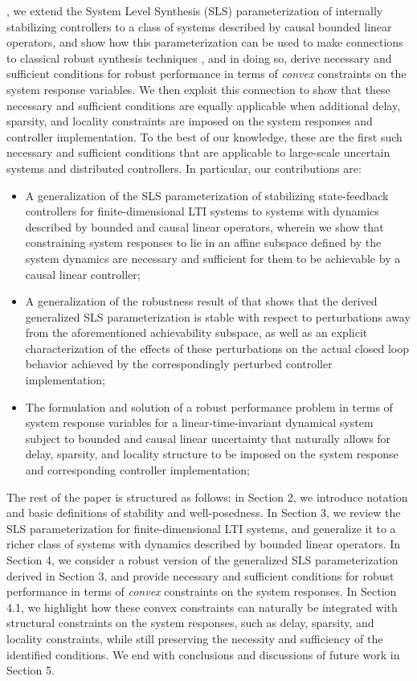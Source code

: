 , we extend the System Level Synthesis (SLS) parameterization of internally stabilizing controllers to a class of systems described by causal bounded linear operators, and show how this parameterization can be used to make connections to classical robust synthesis techniques \cite{khammash1990stability,dahleh1994control}, and in doing so, derive necessary and sufficient conditions for robust performance in terms of \emph{convex} constraints on the system response variables.  We then exploit this connection to show that these necessary and sufficient conditions are equally applicable when additional delay, sparsity, and locality constraints are imposed on the system responses and controller implementation.  To the best of our knowledge, these are the first such necessary and sufficient conditions that are applicable to large-scale uncertain systems and distributed controllers.  In particular, our contributions are:
\begin{itemize}
\item A generalization of the SLS parameterization of stabilizing state-feedback controllers for finite-dimensional LTI systems \cite{wang2019system} to systems with dynamics described by bounded and causal linear operators, wherein we show that constraining system responses to lie in an affine subspace defined by the system dynamics are necessary and sufficient for them to be achievable by a causal linear controller;
\item A generalization of the robustness result of \cite{matni2017scalable} that shows that the derived generalized SLS parameterization is stable with respect to perturbations away from the aforementioned achievability subspace, as well as an explicit characterization of the effects of these perturbations on the actual closed loop behavior achieved by the correspondingly perturbed controller implementation;
\item The formulation and solution of a robust performance problem in terms of system response variables for a linear-time-invariant dynamical system subject to bounded and causal linear uncertainty that naturally allows for delay, sparsity, and locality structure to be imposed on the system response and corresponding controller implementation;
\end{itemize}

The rest of the paper is structured as follows: in Section 2, we introduce notation and basic definitions of stability and well-posedness.  In Section 3, we review the SLS parameterization for finite-dimensional LTI systems, and generalize it to a richer class of systems with dynamics described by bounded linear operators.  In Section 4, we consider a robust version of the generalized SLS parameterization derived in Section 3, and provide necessary and sufficient conditions for robust performance in terms of \emph{convex} constraints on the system responses.  In Section 4.1, we highlight how these convex constraints can naturally be integrated with structural constraints on the system responses, such as delay, sparsity, and locality constraints, while still preserving the necessity and sufficiency of the identified conditions.  We end with conclusions and discussions of future work in Section 5.
